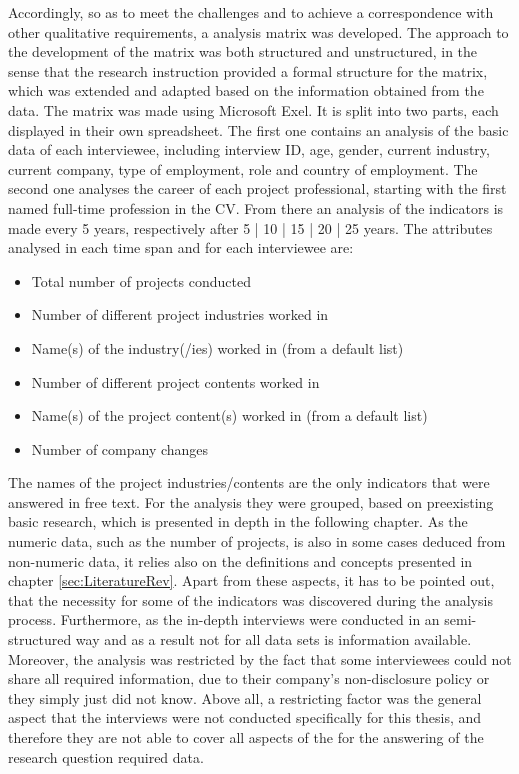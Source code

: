 Accordingly,  so as to meet the challenges and to achieve a correspondence with other qualitative requirements, a analysis matrix was developed. The approach to the development of the matrix was both structured and unstructured, in the sense that the research instruction provided a formal structure for the matrix, which was extended and adapted based on the information obtained from the data. The matrix was made using Microsoft Exel. It is split into two parts, each displayed in their own spreadsheet. The first one contains an analysis of the basic data of each interviewee, including interview ID, age, gender, current industry, current company, type of employment, role and country of employment. The second one analyses the career of each project professional, starting with the first named full-time profession in the CV. From there an analysis of the indicators is made every 5 years, respectively after 5 | 10 | 15 | 20 | 25 years. The attributes analysed in each time span and for each interviewee are:
\begin{itemize}[itemsep=0.05cm]
    \item Total number of projects conducted
    \item Number of different project industries worked in
    \item Name(s) of the industry(/ies) worked in (from a default list)
    \item Number of different project contents worked in
    \item Name(s) of the project content(s) worked in (from a default list)
    \item Number of company changes
\end{itemize}
The names of the project industries/contents are the only indicators that were answered in free text. For the analysis they were grouped, based on preexisting basic research, which is presented in depth in the following chapter. As the numeric data, such as the number of projects, is also in some cases deduced from non-numeric data, it relies also on the definitions and concepts presented in chapter \ref{sec:LiteratureRev}. Apart from these aspects, it has to be pointed out, that the necessity for some of the indicators was discovered during the analysis process. Furthermore, as the in-depth interviews were conducted in an semi-structured way and as a result not for all data sets is information available. Moreover, the analysis was restricted by the fact that some interviewees could not share all required information, due to their company's non-disclosure policy or they simply just did not know. Above all, a restricting factor was the general aspect that the interviews were not conducted specifically for this thesis, and therefore they are not able to cover all aspects of the for the answering of the research question required data.

